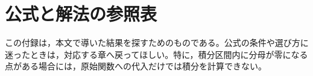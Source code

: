 \chapter{公式と解法の参照表}\label{章:参照表}
この付録は，本文で導いた結果を探すためのものである。公式の条件や選び方に迷ったときは，対応する章へ戻ってほしい。特に，積分区間内に分母が零になる点がある場合には，原始関数への代入だけでは積分を計算できない。

%
%
%
%
%
%
